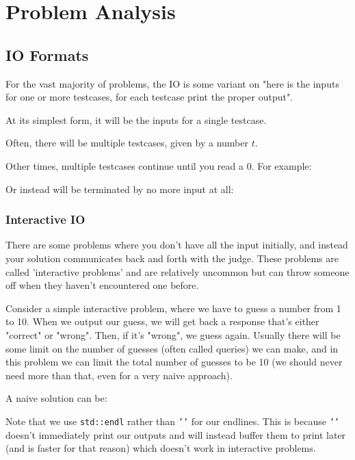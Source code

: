 \section{Problem Analysis}
\subsection{IO Formats}

For the vast majority of problems, the IO is some variant on "here is the inputs for one or more testcases, for each testcase print the proper output".

At its simplest form, it will be the inputs for a single testcase.


Often, there will be multiple testcases, given by a number $t$.


Other times, multiple testcases continue until you read a 0. For example:


Or instead will be terminated by no more input at all:


\subsubsection{Interactive IO}

There are some problems where you don't have all the input initially, and instead your solution communicates back and forth with the judge. These problems are called 'interactive problems' and are relatively uncommon but can throw someone off when they haven't encountered one before.

Consider a simple interactive problem, where we have to guess a number from 1 to 10. When we output our guess, we will get back a response that's either "correct" or "wrong". Then, if it's "wrong", we guess again. Usually there will be some limit on the number of guesses (often called queries) we can make, and in this problem we can limit the total number of guesses to be 10 (we should never need more than that, even for a very naive approach).

A naive solution can be:


Note that we use \texttt{std::endl} rather than \texttt{'\n'} for our endlines. This is because \texttt{'\n'} doesn't immediately print our outputs and will instead buffer them to print later (and is faster for that reason) which doesn't work in interactive problems.


